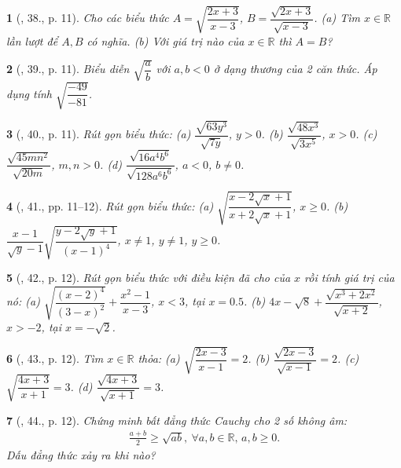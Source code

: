 \documentclass{article}
\newtheorem{baitoan}{}%
\begin{document}
\begin{baitoan}[\cite{SBT_Toan_9_tap_1}, 38., p. 11]
	Cho các biểu thức $A = \sqrt{\dfrac{2x + 3}{x - 3}}$, $B = \dfrac{\sqrt{2x + 3}}{\sqrt{x - 3}}$. (a) Tìm $x\in\mathbb{R}$ lần lượt để $A,B$ có nghĩa. (b) Với giá trị nào của $x\in\mathbb{R}$ thì $A = B$?
\end{baitoan}

\begin{baitoan}[\cite{SBT_Toan_9_tap_1}, 39., p. 11]
	Biểu diễn $\sqrt{\dfrac{a}{b}}$ với $a,b < 0$ ở dạng thương của 2 căn thức. Áp dụng tính $\sqrt{\dfrac{-49}{-81}}$.
\end{baitoan}

\begin{baitoan}[\cite{SBT_Toan_9_tap_1}, 40., p. 11]
	Rút gọn biểu thức: (a) $\dfrac{\sqrt{63y^3}}{\sqrt{7y}}$, $y > 0$. (b) $\dfrac{\sqrt{48x^3}}{\sqrt{3x^5}}$, $x > 0$. (c) $\dfrac{\sqrt{45mn^2}}{\sqrt{20m}}$, $m,n > 0$. (d) $\dfrac{\sqrt{16a^4b^6}}{\sqrt{128a^6b^6}}$, $a < 0$, $b\ne0$.
\end{baitoan}

\begin{baitoan}[\cite{SBT_Toan_9_tap_1}, 41., pp. 11--12]
	Rút gọn biểu thức: (a) $\sqrt{\dfrac{x - 2\sqrt{x} + 1}{x + 2\sqrt{x} + 1}}$, $x\ge0$. (b) $\dfrac{x - 1}{\sqrt{y} - 1}\sqrt{\dfrac{y - 2\sqrt{y} + 1}{(x - 1)^4}}$, $x\ne1$, $y\ne1$, $y\ge0$.
\end{baitoan}

\begin{baitoan}[\cite{SBT_Toan_9_tap_1}, 42., p. 12]
	Rút gọn biểu thức với điều kiện đã cho của $x$ rồi tính giá trị của nó: (a) $\sqrt{\dfrac{(x - 2)^4}{(3 - x)^2}} + \dfrac{x^2 - 1}{x - 3}$, $x < 3$, tại $x = 0.5$. (b) $4x - \sqrt{8} + \dfrac{\sqrt{x^3 + 2x^2}}{\sqrt{x + 2}}$, $x > -2$, tại $x = -\sqrt{2}$.
\end{baitoan}

\begin{baitoan}[\cite{SBT_Toan_9_tap_1}, 43., p. 12]
	Tìm $x\in\mathbb{R}$ thỏa: (a) $\sqrt{\dfrac{2x - 3}{x - 1}} = 2$. (b) $\dfrac{\sqrt{2x - 3}}{\sqrt{x - 1}} = 2$. (c) $\sqrt{\dfrac{4x + 3}{x + 1}} = 3$. (d) $\dfrac{\sqrt{4x + 3}}{\sqrt{x + 1}} = 3$.
\end{baitoan}

\begin{baitoan}[\cite{SBT_Toan_9_tap_1}, 44., p. 12]
	Chứng minh bất đẳng thức Cauchy cho 2 số không âm:
	\begin{align*}
		\frac{a + b}{2}\ge\sqrt{ab},\ \forall a,b\in\mathbb{R},\,a,b\ge0.
	\end{align*}
	Dấu đẳng thức xảy ra khi nào?
\end{baitoan}
\end{document}
